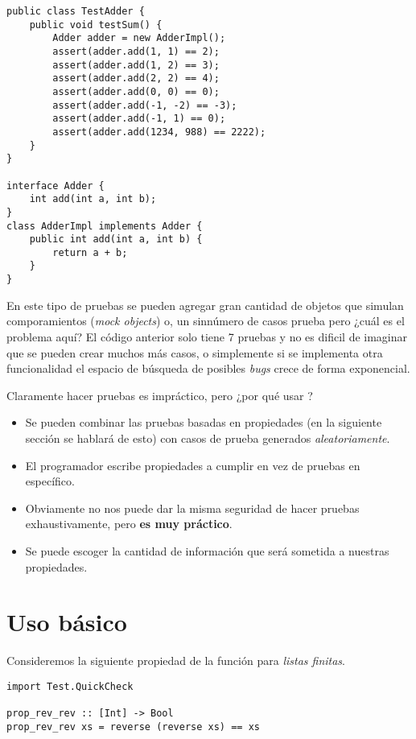 \begin{verbatim}
public class TestAdder {
    public void testSum() {
        Adder adder = new AdderImpl();
        assert(adder.add(1, 1) == 2);
        assert(adder.add(1, 2) == 3);
        assert(adder.add(2, 2) == 4);
        assert(adder.add(0, 0) == 0);
        assert(adder.add(-1, -2) == -3);
        assert(adder.add(-1, 1) == 0);
        assert(adder.add(1234, 988) == 2222);
    }
}

interface Adder {
    int add(int a, int b);
}
class AdderImpl implements Adder {
    public int add(int a, int b) {
        return a + b;
    }
}
\end{verbatim}

En este tipo de pruebas se pueden agregar gran cantidad de objetos que simulan comporamientos 
(\textit{mock objects}) o, un sinnúmero de casos prueba pero ¿cuál es el problema aquí? El código
anterior solo tiene 7 pruebas y no es dificil de imaginar que se pueden crear muchos más casos, o
simplemente si se implementa otra funcionalidad el espacio de búsqueda de posibles \textit{bugs}
crece de forma exponencial.

Claramente hacer pruebas es impráctico, pero ¿por qué usar \QuickCheck?
\begin{itemize}
\item Se pueden combinar las pruebas basadas en propiedades (en la siguiente sección se hablará
de esto) con casos de prueba generados \textit{aleatoriamente}.
\item El programador escribe propiedades a cumplir en vez de pruebas en específico.
\item Obviamente no nos puede dar la misma seguridad de hacer pruebas exhaustivamente, pero
\textbf{es muy práctico}.
\item Se puede escoger la cantidad de información que será sometida a nuestras propiedades.
\end{itemize}


\section{Uso básico}

Consideremos la siguiente propiedad de la función  para \textit{listas finitas}.
\begin{verbatim}
import Test.QuickCheck

prop_rev_rev :: [Int] -> Bool
prop_rev_rev xs = reverse (reverse xs) == xs
\end{verbatim}

